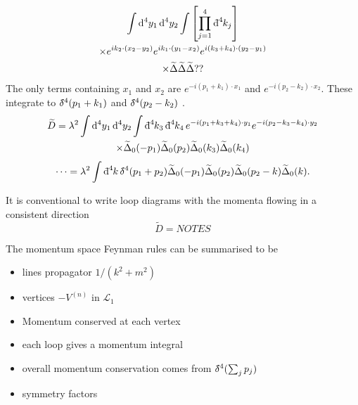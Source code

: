 \begin{example}
\begin{multline}
    \int \dd[4]{y_1} \dd[4]{y_2} \int \left[ \prod_{j = 1}^4 \bdd[4]{k_j} \right] \\
    \times e^{i k_2 \cdot (x_2 - y_2)} e^{i k_1 \cdot (y_1 - x_2)} e^{i (k_3 + k_4) \cdot (y_2 - y_1)} \\
    \times \widetilde{\Delta} \widetilde{\Delta} \widetilde{\Delta} ??
  \end{multline}
  The only terms containing $x_1$ and $x_2$ are $e^{-i (p_1 + k_1) \cdot x_1}$ and $e^{-i (p_2  - k_2) \cdot x_2}$.
  These integrate to $\bdelta^4(p_1 + k_1)$ and $\bdelta^4(p_2 - k_2)$ .
  \begin{multline}
    \widetilde{D} = \lambda^2 \int \dd[4]{y_1} \dd[4]{y_2} \int \bdd[4]{k_3} \bdd[4]{k_4} e^{-i (p_1 + k_3 + k_4) \cdot y_1} e^{-i (p_2 - k_3 - k_4) \cdot y_2}  \\
    \times \widetilde{\Delta}_0 (-p_1) \widetilde{\Delta}_0(p_2) \widetilde{\Delta}_0(k_3) \widetilde{\Delta}_0(k_4)
  \end{multline}
  \begin{equation}
    \dots = \lambda^2 \int \bdd[4]{k} \bdelta^4(p_1 + p_2) \widetilde{\Delta}_0 (-p_1) \widetilde{\Delta}_0(p_2) \widetilde{\Delta}_0(p_2 - k) \widetilde{\Delta}_0(k).
  \end{equation}
\end{example}

It is conventional to write loop diagrams with the momenta flowing in a consistent direction
\begin{equation}
  \widetilde{D} = NOTES
\end{equation}

The momentum space Feynman rules can be summarised to be
\begin{itemize}
  \item lines propagator $1 / (k^2 + m^2)$
  \item vertices $-V^(n)$ in $\mathscr{L}_1$
  \item Momentum conserved at each vertex
  \item each loop gives a momentum integral
  \item overall momentum conservation comes from $\bdelta^4(\sum_j p_j)$ 
  \item symmetry factors
\end{itemize}
